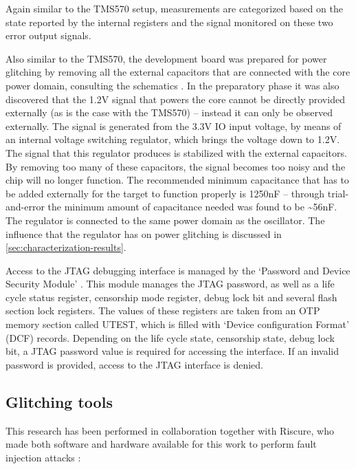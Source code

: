 \documentclass[10pt]{article}
\newcommand{\TI}{TMS570\xspace}
\begin{document}
      \noindent Again similar to the \TI setup, measurements are categorized based on the state reported by the internal registers and the signal monitored on these two error output signals. 

      Also similar to the \TI, the development board was prepared for power glitching by removing all the external capacitors that are connected with the core power domain, consulting the schematics \cite{stmicroelectronics_schematic_2015}. In the preparatory phase it was also discovered that the 1.2V signal that powers the core cannot be directly provided externally (as is the case with the \TI) -- instead it can only be observed externally. The signal is generated from the 3.3V IO input voltage, by means of an internal voltage switching regulator, which brings the voltage down to 1.2V. The signal that this regulator produces is stabilized with the external capacitors. By removing too many of these capacitors, the signal becomes too noisy and the chip will no longer function. The recommended minimum capacitance that has to be added externally for the target to function properly is 1250nF \cite{stmicroelectronics_datasheet_2015} -- through trial-and-error the minimum amount of capacitance needed was found to be \textasciitilde56nF. The regulator is connected to the same power domain as the oscillator. The influence that the regulator has on power glitching is discussed in \autoref{sec:characterization-results}.


      Access to the JTAG debugging interface is managed by the `Password and Device Security Module' 
      \cite{stmicroelectronics_technical_2015}. This module manages the JTAG password, as well as a life cycle status register, censorship mode register, debug lock bit and several flash section lock registers. The values of these registers are taken from an OTP memory section called UTEST, which is filled with `Device configuration Format' (DCF) records. Depending on the life cycle state, censorship state, debug lock bit, a JTAG password value is required for accessing the interface. If an invalid password is provided, access to the JTAG interface is denied.

  \subsection{Glitching tools }
  \label{sec:hardwareused}
    This research has been performed in collaboration together with Riscure, who made both software and hardware available for this work to perform fault injection attacks \cite{riscure_hardware}: 
\end{document}
